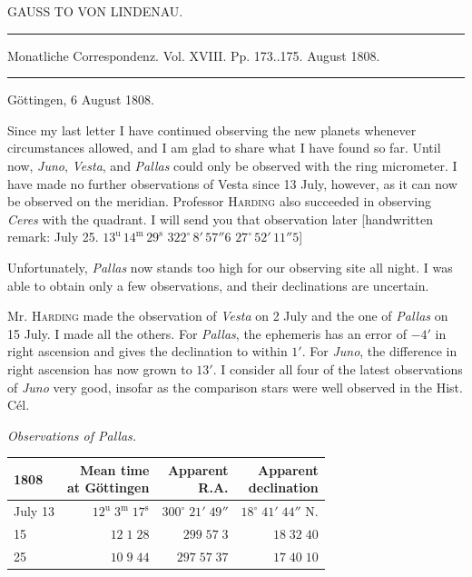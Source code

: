 \clearpage
{}
\begin{center}
GAUSS TO VON LINDENAU.
\end{center}

\hrule
\begin{center}
\fontsize{10}{12}\selectfont Monatliche Correspondenz. Vol. XVIII. Pp. 173..175. August 1808.
\end{center}
\hrule

\begin{flushright}
Göttingen, 6 August 1808.
\end{flushright}

\par\indent Since my last letter I have continued observing the new planets whenever circumstances allowed, and I am glad to share what I have found so far. Until now, \emph{Juno}, \emph{Vesta}, and \emph{Pallas} could only be observed with the ring micrometer. I have made no further observations of Vesta since 13 July, however, as it can now be observed on the meridian. Professor \textsc{Harding} also succeeded in observing \emph{Ceres} with the quadrant. I will send you that observation later [handwritten remark: July 25. $13^{\text{u}}\,14^{\text{m}}\,29^{\text{s}}$ \quad $322^\circ\,8'\,57''6$ \quad $27^\circ\,52'\,11''5$]

\par\indent Unfortunately, \emph{Pallas} now stands too high for our observing site all night. I was able to obtain only a few observations, and their declinations are uncertain.

\par\indent Mr. \textsc{Harding} made the observation of \emph{Vesta} on 2 July and the one of \emph{Pallas} on 15 July. I made all the others. For \emph{Pallas}, the ephemeris has an error of $-4'$ in right ascension and gives the declination to within $1'$. For \emph{Juno}, the difference in right ascension has now grown to $13'$. I consider all four of the latest observations of \emph{Juno} very good, insofar as the comparison stars were well observed in the Hist. Cél.

\begin{center}
\emph{Observations of Pallas.}
\end{center}


\begin{center}\fontsize{10}{12}\selectfont\setlength{\tabcolsep}{3pt}\renewcommand{\arraystretch}{1.15}\begin{tabular}{lrrr}
1808 & \shortstack{Mean time\\at Göttingen} & \shortstack{Apparent\\R.A.} & \shortstack{Apparent\\declination}\\\hline
July 13 & $12^{\text{u}}\;3^{\text{m}}\;17^{\text{s}}$ & $300^\circ\;21'\;49''$ & $18^\circ\;41'\;44''$ N.\\
15 & $12\;1\;28$ & $299\;57\;3$ & $18\;32\;40$\\
25 & $10\;9\;44$ & $297\;57\;37$ & $17\;40\;10$\\
\end{tabular}\end{center}


